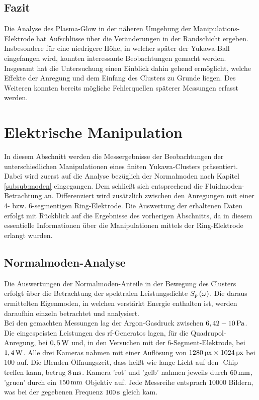 \newpage

      \subsection*{Fazit}

          Die Analyse des Plasma-Glow in der näheren Umgebung der Manipulations-Elektrode hat Aufschlüsse über die Veränderungen in der Randschicht ergeben. Insbesondere für eine niedrigere Höhe, in welcher später der Yukawa-Ball eingefangen wird, konnten interessante Beobachtungen gemacht werden. Insgesamt hat die Untersuchung einen Einblick dahin gehend ermöglicht, welche Effekte der Anregung und dem Einfang des Clusters zu Grunde liegen. Des Weiteren konnten bereits mögliche Fehlerquellen späterer Messungen erfasst werden.

    \newpage

  \section{Elektrische Manipulation}\label{sec:manip}

    In diesem Abschnitt werden die Messergebnisse der Beobachtungen der unterschiedlichen Manipulationen eines finiten Yukawa-Clusters präsentiert. Dabei wird zuerst auf die Analyse bezüglich der Normalmoden nach Kapitel \ref{subsub:moden} eingegangen. Dem schließt sich entsprechend die Fluidmoden-Betrachtung an. Differenziert wird zusätzlich zwischen den Anregungen mit einer 4- bzw. 6-segmentigen Ring-Elektrode. Die Auswertung der erhaltenen Daten erfolgt mit Rückblick auf die Ergebnisse des vorherigen Abschnitts, da in diesem essentielle Informationen über die Manipulationen mittels der Ring-Elektrode erlangt wurden.

    \subsection{Normalmoden-Analyse}

      Die Auswertungen der Normalmoden-Anteile in der Bewegung des Clusters erfolgt über die Betrachtung der spektralen Leistungsdichte $S_\text{p}\left(\omega\right)$. Die daraus ermittelten Eigenmoden, in welchen verstärkt Energie enthalten ist, werden daraufhin einzeln betrachtet und analysiert.\\
      Bei den gemachten Messungen lag der Argon-Gasdruck zwischen $\unit[6,42-10]{Pa}$. Die eingespeisten Leistungen des rf-Generatos lagen, für die Quadrupol-Anregung, bei $\unit[0,5]{W}$ und, in den Versuchen mit der 6-Segment-Elektrode, bei $\unit[1,4]{W}$. Alle drei Kameras nahmen mit einer Auflösung von $\unit[1280]{px}\times\unit[1024]{px}$ bei 100  auf. Die Blenden-Öffnungszeit, dass heißt wie lange Licht auf den -Chip treffen kann, betrug $\unit[8]{ms}$. Kamera 'rot' und 'gelb' nahmen jeweils durch $\unit[60]{mm}$, 'gruen' durch ein $\unit[150]{mm}$ Objektiv auf. Jede Messreihe entsprach 10000 Bildern, was bei der gegebenen Frequenz $\unit[100]{s}$ gleich kam.

